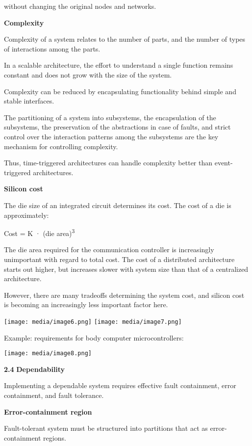 without changing the original nodes and networks.

\textbf{Complexity}

Complexity of a system relates to the number of parts, and the number of
types of interactions among the parts.

In a scalable architecture, the effort to understand a single function
remains constant and does not grow with the size of the system.

Complexity can be reduced by encapsulating functionality behind simple
and stable interfaces.

The partitioning of a system into subsystems, the encapsulation of the
subsystems, the preservation of the abstractions in case of faults, and
strict control over the interaction patterns among the subsystems are
the key mechanism for controlling complexity.

Thus, time-triggered architectures can handle complexity better than
event-triggered architectures.

\textbf{Silicon cost}

The die size of an integrated circuit determines its cost. The cost of a
die is approximately:

Cost = K · (die area)\textsuperscript{3}

The die area required for the communication controller is increasingly
unimportant with regard to total cost. The cost of a distributed
architecture starts out higher, but increases slower with system size
than that of a centralized architecture.

However, there are many tradeoffs determining the system cost, and
silicon cost is becoming an increasingly less important factor here.

\texttt{[image: media/image6.png]}
\texttt{[image: media/image7.png]}

Example: requirements for body computer microcontrollers:

\protect\hypertarget{ux5fux5fFieldmarkux5fux5f9ux5f1847268712}{}{}\texttt{[image: media/image8.png]}

\textbf{2.4} \protect\hypertarget{teil5}{}{}\textbf{Dependability}

Implementing a dependable system requires effective fault containment,
error containment, and fault tolerance.

\textbf{Error-containment region}

Fault-tolerant system must be structured into partitions that act as
error-containment regions.

